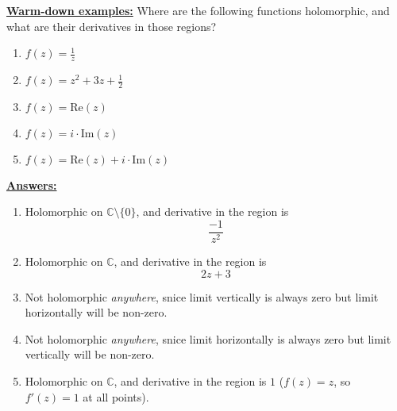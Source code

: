 \documentclass{article}
\newcommand{\C}{\mathbb{C}}
\begin{document}
\vskip 0.5cm
\underline{\textbf{Warm-down examples:}} Where are the following functions holomorphic, and what are their derivatives in those regions?

\begin{enumerate}
  \item $f(z) = \frac{1}{z}$
  \item $f(z) = z^2 + 3z + \frac{1}{2}$
  \item $f(z) = \text{Re}(z)$
  \item $f(z) = i \cdot \text{Im}(z)$
  \item $f(z) = \text{Re}(z) + i \cdot \text{Im}(z)$
\end{enumerate}

\vskip 0.5cm
\underline{\textbf{Answers:}}
\begin{enumerate}
  \item Holomorphic on $\C \setminus \{0\}$, and derivative in the region is 
  \[ \frac{-1}{z^2} \]
  
  \item Holomorphic on $\C$, and derivative in the region is 
  \[ 2z + 3 \]

  \item Not holomorphic \emph{anywhere}, snice limit vertically is always zero but limit horizontally will be non-zero. 

  \item Not holomorphic \emph{anywhere}, snice limit horizontally is always zero but limit vertically will be non-zero. 

  \item Holomorphic on $\C$, and derivative in the region is $1$ ($f(z) = z$, so $f'(z) = 1$ at all points).
\end{enumerate}
\end{document}
